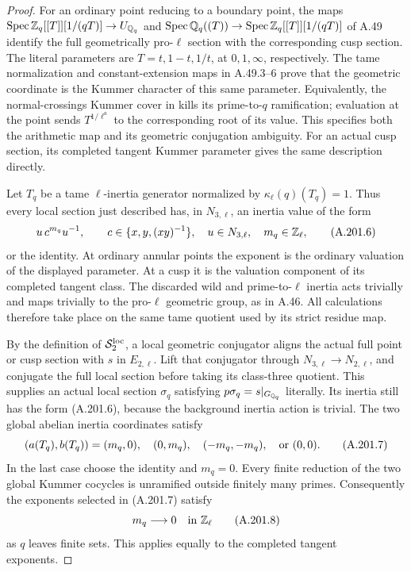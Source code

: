 \begin{proof}
For an ordinary point reducing to a boundary point, the maps
\(\operatorname{Spec}\Z_q[[T]][1/(qT)]\to U_{\Q_q}\)
and \(\operatorname{Spec}\Q_q((T))\to
\operatorname{Spec}\Z_q[[T]][1/(qT)]\) of A.49 identify
the full geometrically pro-\(\ell\) section with the
corresponding cusp section.  The literal parameters are
\(T=t,1-t,1/t\), at \(0,1,\infty\), respectively.
The tame normalization and constant-extension maps in
A.49.3--6 prove that the geometric coordinate is the
Kummer character of this same parameter.  Equivalently,
the normal-crossings Kummer cover in
\cite[Expos\'e XIII, Propositions 5.1--5.2,
pp.314--315]{AgentSGA1} kills its prime-to-\(q\) ramification;
evaluation at the point sends \(T^{1/\ell^a}\) to the
corresponding root of its value.  This specifies both the
arithmetic map and its geometric conjugation ambiguity.
For an actual cusp section, its completed tangent Kummer
parameter gives the same description directly.

Let \(T_q\) be a tame \(\ell\)-inertia generator normalized
by \(\kappa_\ell(q)(T_q)=1\).  Thus every local section just
described has, in \(N_{3,\ell}\), an inertia value of the form
\[
             u\,c^{m_q}u^{-1},\qquad
 c\in\{x,y,(xy)^{-1}\},\quad u\in N_{3,\ell},
                              \quad m_q\in\Z_\ell,
\tag{A.201.6}
\]
or the identity.  At ordinary annular points the exponent is
the ordinary valuation of the displayed parameter.  At a cusp
it is the valuation component of its completed tangent class.
The discarded wild and prime-to-\(\ell\) inertia acts trivially
and maps trivially to the pro-\(\ell\) geometric group, as
in A.46.  All calculations therefore take place on the same
tame quotient used by its strict residue map.

By the definition of \(\mathscr S^{\rm loc}_2\), a local
geometric conjugator aligns the actual full point or cusp
section with \(s\) in \(E_{2,\ell}\).  Lift that conjugator
through \(N_{3,\ell}\to N_{2,\ell}\), and conjugate the
full local section before taking its class-three quotient.
This supplies an actual local section \(\sigma_q\) satisfying
\(p\sigma_q=s|_{G_{\Q_q}}\) literally.  Its inertia still
has the form (A.201.6), because the background inertia action
is trivial.  The two global abelian inertia coordinates satisfy
\[
 (a(T_q),b(T_q))=(m_q,0),\quad(0,m_q),\quad
                     (-m_q,-m_q),\quad\hbox{or }(0,0).
\tag{A.201.7}
\]
In the last case choose the identity and \(m_q=0\).
Every finite reduction of the two global Kummer cocycles is
unramified outside finitely many primes.  Consequently the
exponents selected in (A.201.7) satisfy
\[
                         m_q\longrightarrow0\quad\hbox{in }\Z_\ell
\tag{A.201.8}
\]
as \(q\) leaves finite sets.  This applies equally to the
completed tangent exponents.


\end{proof}
